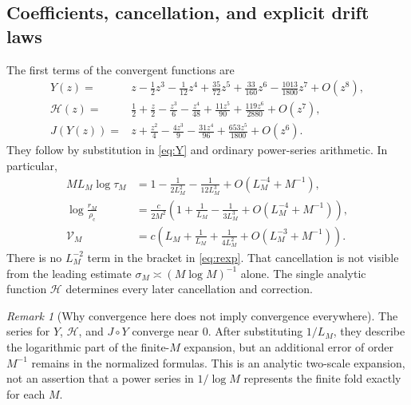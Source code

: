 \documentclass[11pt,a4paper]{article}
\numberwithin{equation}{section}
\theoremstyle{definition}
\theoremstyle{remark}
\newtheorem{remark}[theorem]{Remark}
\newcommand{\rhoc}{\rho_{\mathrm c}}
\begin{document}
\subsection{Coefficients, cancellation, and explicit drift laws}
The first terms of the convergent functions are
\begin{align}
 Y(z)={}&z-\frac12z^3-\frac1{12}z^4+\frac{35}{72}z^5
                +\frac{33}{160}z^6-\frac{1013}{1800}z^7+O(z^8),
 \label{eq:Ycoeff}\\
 \mathcal H(z)={}&\frac12+\frac z2-\frac{z^3}{6}
      -\frac{z^4}{48}+\frac{11z^5}{90}
      +\frac{119z^6}{2880}+O(z^7),\label{eq:Hcoeff}\\
 J(Y(z))={}&z+\frac{z^2}{4}-\frac{4z^3}{9}
      -\frac{31z^4}{96}+\frac{653z^5}{1800}+O(z^6).
 \label{eq:Jcoeff}
\end{align}
They follow by substitution in \eqref{eq:Y} and ordinary power-series
arithmetic. In particular,
\begin{align}
 M L_M\log\tau_M&=1-\frac1{2L_M^2}
      -\frac1{12L_M^3}+O(L_M^{-4}+M^{-1}),\label{eq:tauexp}\\
 \log\frac{r_M}{\rhoc}
 &=\frac{c}{2M^2}\left(1+\frac1{L_M}-\frac1{3L_M^3}
              +O(L_M^{-4}+M^{-1})\right),\label{eq:rexp}\\
 \mathcal V_M&=c\left(L_M+\frac1{L_M}
             +\frac1{4L_M^2}+O(L_M^{-3}+M^{-1})\right).
 \label{eq:Vexpfold}
\end{align}
There is no $L_M^{-2}$ term in the bracket in \eqref{eq:rexp}.
That cancellation is not visible from the leading estimate
$\sigma_M\asymp(M\log M)^{-1}$ alone. The single analytic function
$\mathcal H$ determines every later cancellation and correction.

\begin{remark}[Why convergence here does not imply convergence everywhere]
The series for $Y$, $\mathcal H$, and $J\circ Y$ converge near $0$.
After substituting $1/L_M$, they describe the logarithmic part of the
finite-$M$ expansion, but an additional error of order $M^{-1}$ remains
in the normalized formulas. This is an analytic two-scale expansion,
not an assertion that a power series in $1/\log M$ represents the
finite fold exactly for each $M$.
\end{remark}
\end{document}
